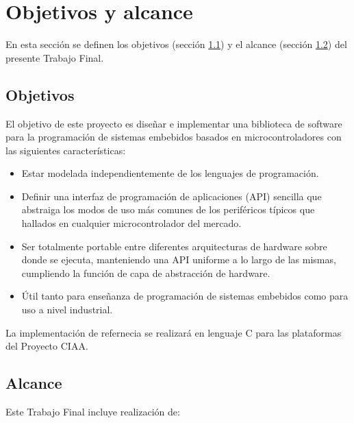\section{Objetivos y alcance}
\label{sec:objetivosAlance}

En esta sección se definen los objetivos (sección \ref{subsec:objetivos}) y el alcance (sección \ref{subsec:alcance}) del presente Trabajo Final.

\subsection{Objetivos}
\label{subsec:objetivos}

El objetivo de este proyecto es diseñar e implementar una biblioteca de software para la programación de sistemas embebidos basados en microcontroladores con las siguientes características: 

\begin{itemize}
\item
Estar modelada independientemente de los lenguajes de programación.
\item
Definir una interfaz de programación de aplicaciones (API) sencilla que abstraiga los modos de uso más comunes de los periféricos típicos que hallados en cualquier microcontrolador del mercado. 
\item
Ser totalmente portable entre diferentes arquitecturas de hardware sobre donde se ejecuta, manteniendo una API uniforme a lo largo de las mismas, cumpliendo la función de capa de abstracción de hardware.
\item
Útil tanto para enseñanza de programación de sistemas embebidos como para uso a nivel industrial.
\end{itemize}

La implementación de refernecia se realizará en lenguaje C para las plataformas del Proyecto CIAA.

\subsection{Alcance}
\label{subsec:alcance}

Este Trabajo Final incluye realización de:

